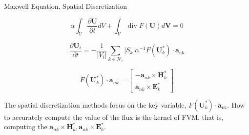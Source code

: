 


\begin{frame}{Maxwell Equation, Spatial Discretization}

\begin{equation}
\alpha \int_{V} \frac{\partial \boldsymbol{U}}{\partial t} d V+\int_{V} \operatorname{div} F(\boldsymbol{U}) d \boldsymbol{V}=0
\end{equation}

\begin{equation}
\frac{\partial \boldsymbol{U}_{i}}{\partial t}=-\frac{1}{\left|V_{i}\right|} \sum_{k\in\mathcal{N}_i}\left|S_{k}\right| \alpha^{-1} F\left(\boldsymbol{U}_{k}^{*}\right) \cdot \boldsymbol{a}_{\mathrm{nk}}
\end{equation}

\begin{equation}
F\left(\boldsymbol{U}_{k}^{*}\right) \cdot \boldsymbol{a}_{n k}=\left[\begin{array}{c}{-\boldsymbol{a}_{n k} \times \boldsymbol{H}_{k}^{*}} \\ {\boldsymbol{a}_{n k} \times \boldsymbol{E}_{k}^{*}}\end{array}\right]
\end{equation}
    
The spatial discretization methods focus on the key variable, $F\left(\boldsymbol{U}_{k}^{*}\right) \cdot \boldsymbol{a}_{\mathrm{nk}}$. How to accurately compute the value of the flux is the kernel of FVM, that is, computing the $\boldsymbol{a}_{n k} \times \boldsymbol{H}_{k}^{*}, \boldsymbol{a}_{n k} \times \boldsymbol{E}_{k}^{*}$.
\end{frame}


